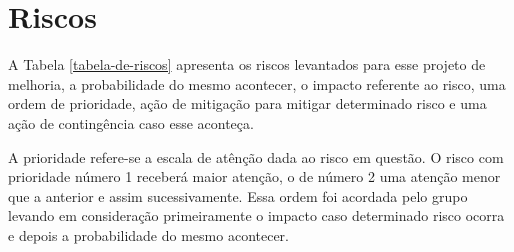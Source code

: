 \chapter[Riscos]{Riscos}

A Tabela \ref{tabela-de-riscos} apresenta os riscos levantados para esse projeto de melhoria, a probabilidade do mesmo acontecer, o impacto referente ao risco, uma ordem de prioridade, ação de mitigação para mitigar determinado risco e uma ação de contingência caso esse aconteça.

A prioridade refere-se a escala de atênção dada ao risco em questão. O risco com prioridade número 1 receberá maior atenção, o de número 2 uma atenção menor que a anterior e assim sucessivamente. Essa ordem foi acordada pelo grupo levando em consideração primeiramente o impacto caso determinado risco ocorra e depois a probabilidade do mesmo acontecer.


